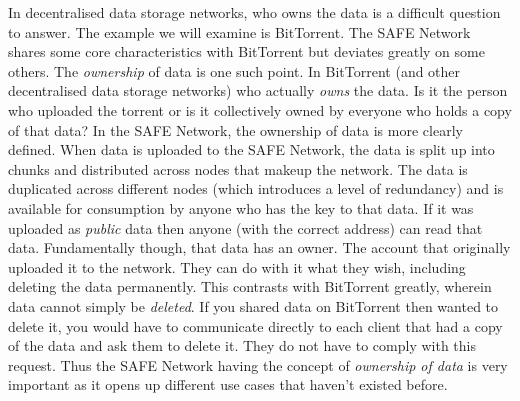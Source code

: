 In decentralised data storage networks, who owns the data is a difficult question to answer. The example we will examine is BitTorrent\cite{cohen2008bittorrent}. The SAFE Network shares some core characteristics with BitTorrent but deviates greatly on some others. The \textit{ownership} of data is one such point. In BitTorrent (and other decentralised data storage networks) who actually \textit{owns} the data. Is it the person who uploaded the torrent or is it collectively owned by everyone who holds a copy of that data? In the SAFE Network, the ownership of data is more clearly defined. When data is uploaded to the SAFE Network, the data is split up into chunks and distributed across nodes that makeup the network. The data is duplicated across different nodes (which introduces a level of redundancy) and is available for consumption by anyone who has the key to that data. If it was uploaded as \textit{public} data then anyone (with the correct address) can read that data. Fundamentally though, that data has an owner. The account that originally uploaded it to the network. They can do with it what they wish, including deleting the data permanently. This contrasts with BitTorrent greatly, wherein data cannot simply be \textit{deleted}. If you shared data on BitTorrent then wanted to delete it, you would have to communicate directly to each client that had a copy of the data and ask them to delete it. They do not have to comply with this request. Thus the SAFE Network having the concept of \textit{ownership of data} is very important as it opens up different use cases that haven't existed before.

